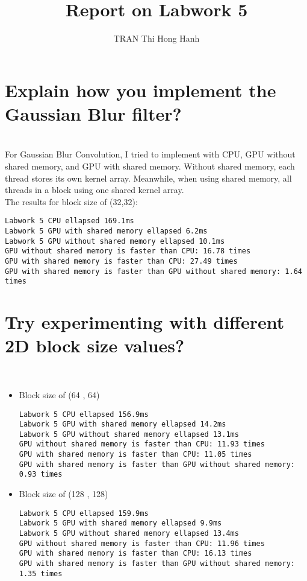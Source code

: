 \documentclass{article}
\title{Report on Labwork 5}
\author{TRAN Thi Hong Hanh}
\begin{document}
\maketitle
\section{Explain how you implement the Gaussian Blur filter?}\\
\noindent
For Gaussian Blur Convolution, I tried to implement with CPU, GPU without shared memory, and GPU with shared memory.
Without shared memory, each thread stores its own kernel array. Meanwhile, when using shared memory, all threads in a block using one shared kernel array.\\
\noindent
The results for block size of (32,32):
\begin{verbatim}
Labwork 5 CPU ellapsed 169.1ms
Labwork 5 GPU with shared memory ellapsed 6.2ms
Labwork 5 GPU without shared memory ellapsed 10.1ms
GPU without shared memory is faster than CPU: 16.78 times
GPU with shared memory is faster than CPU: 27.49 times
GPU with shared memory is faster than GPU without shared memory: 1.64 times
\end{verbatim}
    
\section{Try experimenting with different 2D block size values?}\\

\begin{itemize}
\item Block size of (64 , 64)
\begin{verbatim}
Labwork 5 CPU ellapsed 156.9ms
Labwork 5 GPU with shared memory ellapsed 14.2ms
Labwork 5 GPU without shared memory ellapsed 13.1ms
GPU without shared memory is faster than CPU: 11.93 times
GPU with shared memory is faster than CPU: 11.05 times
GPU with shared memory is faster than GPU without shared memory: 0.93 times            
\end{verbatim}

\item Block size of (128 , 128)
\begin{verbatim}
Labwork 5 CPU ellapsed 159.9ms
Labwork 5 GPU with shared memory ellapsed 9.9ms
Labwork 5 GPU without shared memory ellapsed 13.4ms
GPU without shared memory is faster than CPU: 11.96 times
GPU with shared memory is faster than CPU: 16.13 times
GPU with shared memory is faster than GPU without shared memory: 1.35 times
\end{verbatim}
\end{itemize}
\end{document}
